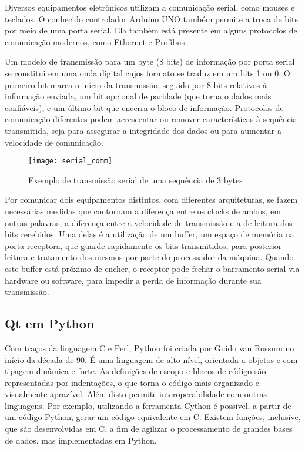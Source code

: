 Diversos equipamentos eletrônicos utilizam a comunicação serial, como mouses e teclados. O conhecido controlador Arduino UNO também permite a troca de bits por meio de uma porta serial. Ela também está presente em alguns protocolos de comunicação modernos, como Ethernet e Profibus.

Um modelo de transmissão para um byte (8 bits) de informação por porta serial se constitui em uma onda digital cujos formato se traduz em um bits 1 ou 0. O primeiro bit marca o início da transmissão, seguido por 8 bits relativos à informação enviada, um bit opcional de paridade (que torna o dados mais confiáveis), e um último bit que encerra o bloco de informação. Protocolos de comunicação diferentes podem acrescentar ou remover características à sequência transmitida, seja para assegurar a integridade dos dados ou para aumentar a velocidade de comunicação.

\begin{figure}
	\centering
	\texttt{[image: serial\_comm]}
	\caption{Exemplo de transmissão serial de uma sequência de 3 bytes}
	\label{img_serial_comm}
\end{figure}

Por comunicar dois equipamentos distintos, com diferentes arquiteturas, se fazem necessárias medidas que contornam a diferença entre os clocks de ambos, em outras palavras, a diferença entre a velocidade de transmissão e a de leitura dos bits recebidos. Uma delas é a utilização de um buffer, um espaço de memória na porta receptora, que guarde rapidamente os bits transmitidos, para posterior leitura e tratamento dos mesmos por parte do processador da máquina. Quando este buffer está próximo de encher, o receptor pode fechar o barramento serial via hardware ou software, para impedir a perda de informação durante sua transmissão.

\subsection{Qt em Python}

Com traços da linguagem C e Perl, Python foi criada por Guido van Rossum no início da década de 90. É uma linguagem de alto nível, orientada a objetos e com tipagem dinâmica e forte. As definições de escopo e blocos de código são representadas por indentações, o que torna o código mais organizado e visualmente aprazível. Além disto permite interoperabilidade com outras linguagens. Por exemplo, utilizando a ferramenta Cython é possível, a partir de um código Python, gerar um código equivalente em C. Existem funções, inclusive, que são desenvolvidas em C, a fim de agilizar o processamento de grandes bases de dados, mas implementadas em Python.

